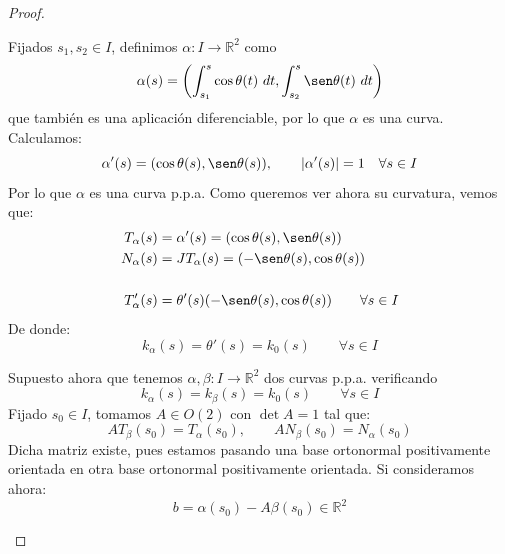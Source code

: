 \begin{teo}
\begin{proof}
\begin{description}
                Fijados $s_1,s_2\in I$, definimos $\alpha:I\to \mathbb{R}^2$ como
                \begin{equation*}
                    \alpha(s) = \left(\int_{s_1}^{s} \cos\theta(t)~dt, \int_{s_2}^{s} \sen\theta(t)~dt  \right)
                \end{equation*}
                que también es una aplicación diferenciable, por lo que $\alpha$ es una curva. Calculamos:
                \begin{equation*}
                    \alpha'(s) = (\cos\theta(s), \sen\theta(s)), \qquad |\alpha'(s)| = 1 \quad \forall s\in I
                \end{equation*}
                Por lo que $\alpha$ es una curva p.p.a. Como queremos ver ahora su curvatura, vemos que:
                \begin{align*}
                    T_\alpha(s) &= \alpha'(s) = (\cos\theta(s), \sen\theta(s)) \\
                    N_\alpha(s) &= JT_\alpha(s) = (-\sen\theta(s), \cos\theta(s)) \\
                    \\
                    T_\alpha'(s) &= \theta'(s) (-\sen\theta(s), \cos\theta(s)) \qquad \forall s\in I
                \end{align*}
                De donde:
                \begin{equation*}
                    k_\alpha(s) = \theta'(s) = k_0(s) \qquad \forall s\in I
                \end{equation*}
            \item [Unicidad.] Supuesto ahora que tenemos $\alpha,\beta:I\to \mathbb{R}^2$ dos curvas p.p.a. verificando
                \begin{equation*}
                    k_\alpha(s) = k_\beta(s) = k_0(s) \qquad \forall s\in I
                \end{equation*}
                Fijado $s_0\in I$, tomamos $A\in O(2)$ con $\det A = 1$ tal que:
                \begin{equation*}
                    AT_\beta(s_0) = T_\alpha(s_0), \qquad AN_\beta(s_0) = N_\alpha(s_0)
                \end{equation*}
                Dicha matriz existe, pues estamos pasando una base ortonormal positivamente orientada en otra base ortonormal positivamente orientada. Si consideramos ahora:
                \begin{equation*}
                    b = \alpha(s_0) - A\beta(s_0)\in \mathbb{R}^2

\end{equation*}
\end{description}
\end{proof}
\end{teo}
